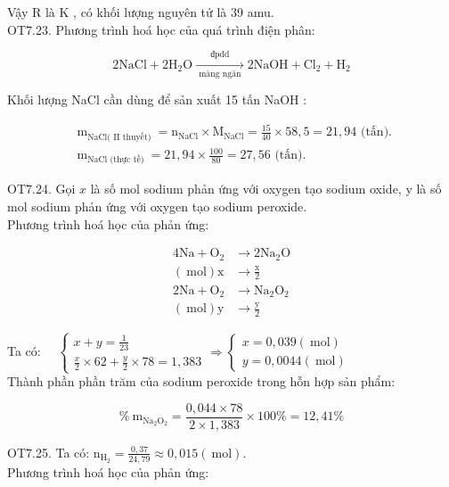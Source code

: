 \documentclass[10pt]{article}
\begin{document}
Vậy R là K , có khối lượng nguyên tử là 39 amu.\\
OT7.23. Phương trình hoá học của quá trình điện phân:

$$
2 \mathrm{NaCl}+2 \mathrm{H}_{2} \mathrm{O} \xrightarrow[\text { màng ngăn }]{\text { đpdd }} 2 \mathrm{NaOH}+\mathrm{Cl}_{2}+\mathrm{H}_{2}
$$

Khối lượng NaCl cần dùng để sản xuất 15 tấn NaOH :

$$
\begin{aligned}
& \mathrm{m}_{\mathrm{NaCl}(\text { II thuyết) }}=\mathrm{n}_{\mathrm{NaCl}} \times \mathrm{M}_{\mathrm{NaCl}}=\frac{15}{40} \times 58,5=21,94 \text { (tấn). } \\
& \mathrm{m}_{\mathrm{NaCl} \text { (thực tề) }}=21,94 \times \frac{100}{80}=27,56 \text { (tấn). }
\end{aligned}
$$

OT7.24. Gọi $x$ là số mol sodium phản ứng với oxygen tạo sodium oxide, y là số mol sodium phản ứng với oxygen tạo sodium peroxide.\\
Phương trình hoá học của phản ứng:

$$
\begin{aligned}
4 \mathrm{Na}+\mathrm{O}_{2} & \rightarrow 2 \mathrm{Na}_{2} \mathrm{O} \\
(\mathrm{~mol}) \mathrm{x} & \rightarrow \frac{\mathrm{x}}{2} \\
2 \mathrm{Na}+\mathrm{O}_{2} & \rightarrow \mathrm{Na}_{2} \mathrm{O}_{2} \\
(\mathrm{~mol}) \mathrm{y} & \rightarrow \frac{\mathrm{y}}{2}
\end{aligned}
$$

Ta có: $\quad\left\{\begin{array}{l}x+y=\frac{1}{23} \\ \frac{x}{2} \times 62+\frac{y}{2} \times 78=1,383\end{array} \Rightarrow\left\{\begin{array}{l}x=0,039(\mathrm{~mol}) \\ y=0,0044(\mathrm{~mol})\end{array}\right.\right.$\\
Thành phần phần trăm của sodium peroxide trong hỗn hợp sản phẩm:

$$
\% \mathrm{~m}_{\mathrm{Na}_{2} \mathrm{O}_{2}}=\frac{0,044 \times 78}{2 \times 1,383} \times 100 \%=12,41 \%
$$

OT7.25. Ta có: $\mathrm{n}_{\mathrm{H}_{2}}=\frac{0,37}{24,79} \approx 0,015(\mathrm{~mol})$.\\
Phương trình hoá học của phản ứng:
\end{document}
